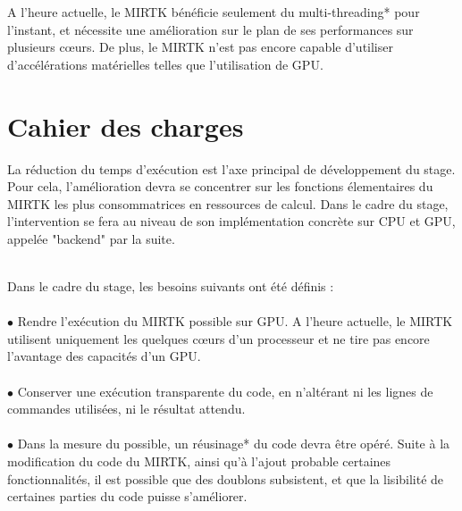 \documentclass[10pt]{report}
\begin{document}
	A l'heure actuelle, le MIRTK bénéficie seulement du multi-threading* pour l'instant, et nécessite une amélioration sur le plan de ses performances sur plusieurs cœurs. De plus,  le MIRTK n'est pas encore capable d'utiliser d'accélérations matérielles telles que l'utilisation de GPU.
	\newpage
	\section{Cahier des charges}
	La réduction du temps d'exécution est l'axe principal de développement du stage. Pour cela, l'amélioration devra se concentrer sur les fonctions élementaires du MIRTK les plus consommatrices en ressources de calcul. Dans le cadre du stage, l'intervention se fera au niveau de son implémentation concrète sur CPU et GPU, appelée "backend" par la suite.\\ ~\par
	
	\noindent Dans le cadre du stage, les besoins suivants ont été définis : \\
	\\{$\bullet$} Rendre l'exécution du MIRTK possible sur GPU. A l'heure actuelle, le MIRTK utilisent uniquement les quelques cœurs d'un processeur et ne tire pas encore l'avantage des capacités d'un GPU.\\
	\\{$\bullet$} Conserver une exécution transparente du code, en n'altérant ni les lignes de commandes utilisées, ni le résultat attendu.  \\
	\\{$\bullet$} Dans la mesure du possible, un réusinage* du code devra être opéré. Suite à la modification du code du MIRTK, ainsi qu'à l'ajout probable certaines fonctionnalités, il est possible que des doublons subsistent, et que la lisibilité de certaines parties du code puisse s'améliorer.	
\end{document}
